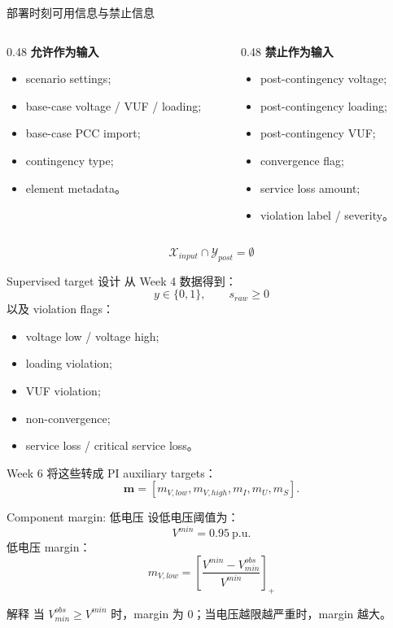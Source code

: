 \documentclass[aspectratio=169,11pt]{beamer}
\begin{document}
\begin{frame}{部署时刻可用信息与禁止信息}
\begin{columns}
\begin{column}{0.48\textwidth}
\textbf{允许作为输入}
\begin{itemize}
  \item scenario settings;
  \item base-case voltage / VUF / loading;
  \item base-case PCC import;
  \item contingency type;
  \item element metadata。
\end{itemize}
\end{column}
\begin{column}{0.48\textwidth}
\textbf{禁止作为输入}
\begin{itemize}
  \item post-contingency voltage;
  \item post-contingency loading;
  \item post-contingency VUF;
  \item convergence flag;
  \item service loss amount;
  \item violation label / severity。
\end{itemize}
\end{column}
\end{columns}
\vspace{0.15cm}
\[
\mathcal X_{input}\cap \mathcal Y_{post}=\emptyset
\]
\end{frame}

\begin{frame}{Supervised target 设计}
从 Week 4 数据得到：
\[
y\in\{0,1\},\qquad s_{raw}\ge 0
\]
以及 violation flags：
\begin{itemize}
  \item voltage low / voltage high;
  \item loading violation;
  \item VUF violation;
  \item non-convergence;
  \item service loss / critical service loss。
\end{itemize}
Week 6 将这些转成 PI auxiliary targets：
\[
\mathbf m=[m_{V,low},m_{V,high},m_I,m_U,m_S].
\]
\end{frame}

\begin{frame}{Component margin: 低电压}
设低电压阈值为：
\[
V^{min}=0.95\ \mathrm{p.u.}
\]
低电压 margin：
\[
m_{V,low}=\left[\frac{V^{min}-V_{min}^{obs}}{V^{min}}\right]_+
\]
\begin{block}{解释}
当 $V_{min}^{obs}\ge V^{min}$ 时，margin 为 0；当电压越限越严重时，margin 越大。
\end{block}
\end{frame}
\end{document}
